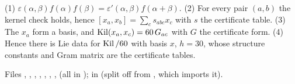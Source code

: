 \begin{theorem}\label{l23:thm:cert}
(1) $\varepsilon(\alpha,\beta)f(\alpha)f(\beta)=\varepsilon'(\alpha,\beta)f(\alpha+\beta)$. (2) For every pair $(a,b)$ the kernel check
 holds, hence $[x_a,x_b]=\sum_cs_{abc}x_c$ with $s$ the certificate table. (3) The $x_a$ form a basis, and
$\operatorname{Kil}(x_a,x_c)=60\,G_{ac}$ with $G$ the certificate form. (4) Hence there is Lie data for $\operatorname{Kil}/60$ with basis $x$, $h=30$, whose
structure constants and Gram matrix are the certificate tables.
\end{theorem}
\noindent Files ,
, , , , , ,  (all in
);  in  (split off from
, which imports it).

